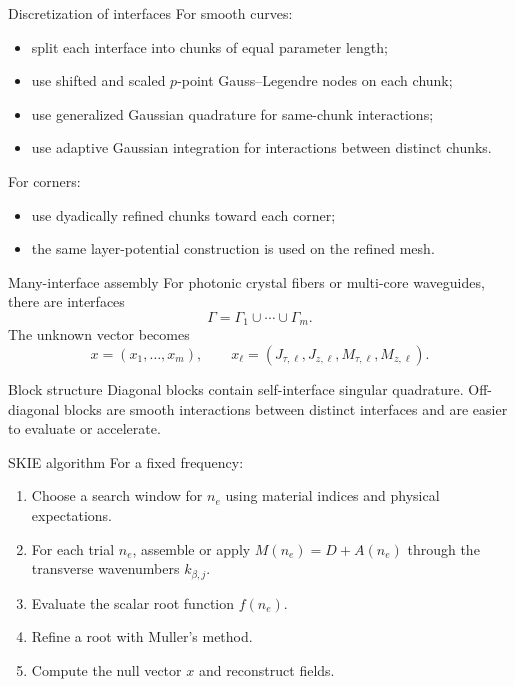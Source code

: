 \documentclass[aspectratio=169,10pt]{beamer}
\begin{document}
\begin{frame}{Discretization of interfaces}
\small
For smooth curves:
\begin{itemize}
  \item split each interface into chunks of equal parameter length;
  \item use shifted and scaled $p$-point Gauss--Legendre nodes on each chunk;
  \item use generalized Gaussian quadrature for same-chunk interactions;
  \item use adaptive Gaussian integration for interactions between distinct
  chunks.
\end{itemize}

For corners:
\begin{itemize}
  \item use dyadically refined chunks toward each corner;
  \item the same layer-potential construction is used on the refined mesh.
\end{itemize}
\end{frame}

\begin{frame}{Many-interface assembly}
\small
For photonic crystal fibers or multi-core waveguides, there are interfaces
\[
  \Gamma=\Gamma_1\cup\cdots\cup\Gamma_m.
\]
The unknown vector becomes
\[
  x=(x_1,\ldots,x_m),\qquad
  x_\ell=(J_{\tau,\ell},J_{z,\ell},M_{\tau,\ell},M_{z,\ell}).
\]

\begin{block}{Block structure}
Diagonal blocks contain self-interface singular quadrature. Off-diagonal
blocks are smooth interactions between distinct interfaces and are easier
to evaluate or accelerate.
\end{block}
\end{frame}

\begin{frame}{SKIE algorithm}
\small
For a fixed frequency:
\begin{enumerate}
  \item Choose a search window for $n_e$ using material indices and physical
  expectations.
  \item For each trial $n_e$, assemble or apply $M(n_e)=D+A(n_e)$ through the
  transverse wavenumbers $k_{\beta,j}$.
  \item Evaluate the scalar root function $f(n_e)$.
  \item Refine a root with Muller's method.
  \item Compute the null vector $x$ and reconstruct fields.
\end{enumerate}
\end{frame}
\end{document}
